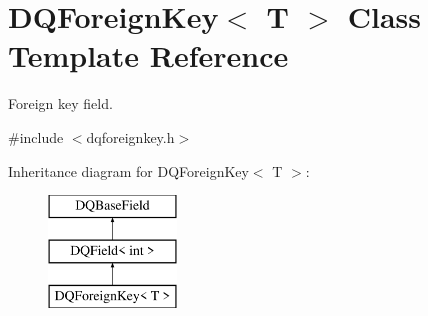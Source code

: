 \hypertarget{classDQForeignKey}{
\section{DQForeignKey$<$ T $>$ Class Template Reference}
\label{classDQForeignKey}
}


Foreign key field.  




{\ttfamily \#include $<$dqforeignkey.h$>$}

Inheritance diagram for DQForeignKey$<$ T $>$:\begin{figure}[H]
\begin{center}
\leavevmode
\includegraphics[height=3.000000cm]{classDQForeignKey}
\end{center}
\end{figure}
